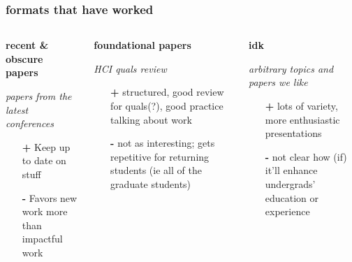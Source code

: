 \documentclass[presentation]{subfiles}
\begin{document}
\begin{frame}[t]\frametitle{formats that have worked}

\begin{columns}[t]

\begin{column}{.33\linewidth}
\begin{center}
\textbf{\large recent \& obscure papers}
\end{center}

\textit{\small papers from the latest conferences}

\begin{itemize}
\item[\alert{\textbf{\large +}}] Keep up to date on stuff
\item[\alert{\textbf{\large -}}] Favors new work more than impactful work
\end{itemize}
\end{column}


\begin{column}{.33\linewidth}
\begin{center}
\textbf{\large foundational papers}
\end{center}
\textit{\small HCI quals review}

\begin{itemize}
\item[\alert{\textbf{\large +}}] structured, good review for quals(?), good practice talking about work
\item[\alert{\textbf{\large -}}] not as interesting; gets repetitive for returning students (ie all of the graduate students)
\end{itemize}
\end{column}


\begin{column}{.33\linewidth}
\begin{center}
\textbf{\large idk}
\end{center}
\textit{\small arbitrary topics and papers we like}

\begin{itemize}
\item[\alert{\textbf{\large +}}] lots of variety, more enthusiastic presentations
\item[\alert{\textbf{\large -}}] not clear how (if) it'll enhance undergrads' education or experience
\end{itemize}

\end{column}

\end{columns}

\end{frame}
\end{document}
